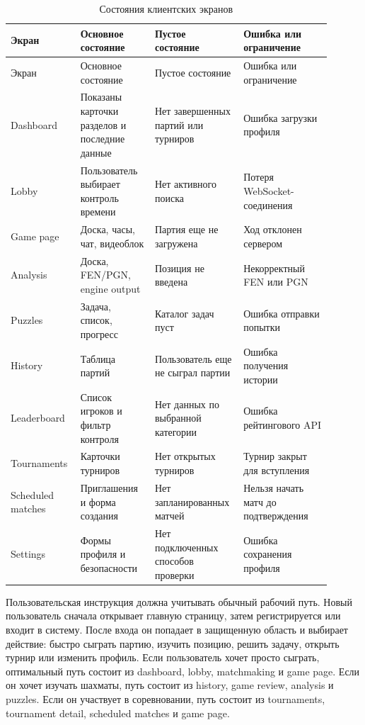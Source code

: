 \noindent\scriptsize
\setlength{\tabcolsep}{3pt}
\renewcommand{\arraystretch}{1.16}
\begin{longtable}{|>{\RaggedRight\arraybackslash}p{0.18\linewidth}|>{\RaggedRight\arraybackslash}p{0.22\linewidth}|>{\RaggedRight\arraybackslash}p{0.24\linewidth}|>{\RaggedRight\arraybackslash}p{0.26\linewidth}|}
\caption{Состояния клиентских экранов}\label{tab:client-screen-states}\\
\hline
Экран & Основное состояние & Пустое состояние & Ошибка или ограничение\\ \hline
\endfirsthead
\hline
Экран & Основное состояние & Пустое состояние & Ошибка или ограничение\\ \hline
\endhead
Dashboard & Показаны карточки разделов и последние данные & Нет завершенных партий или турниров & Ошибка загрузки профиля\\ \hline
Lobby & Пользователь выбирает контроль времени & Нет активного поиска & Потеря WebSocket-соединения\\ \hline
Game page & Доска, часы, чат, видеоблок & Партия еще не загружена & Ход отклонен сервером\\ \hline
Analysis & Доска, FEN/PGN, engine output & Позиция не введена & Некорректный FEN или PGN\\ \hline
Puzzles & Задача, список, прогресс & Каталог задач пуст & Ошибка отправки попытки\\ \hline
History & Таблица партий & Пользователь еще не сыграл партии & Ошибка получения истории\\ \hline
Leaderboard & Список игроков и фильтр контроля & Нет данных по выбранной категории & Ошибка рейтингового API\\ \hline
Tournaments & Карточки турниров & Нет открытых турниров & Турнир закрыт для вступления\\ \hline
Scheduled matches & Приглашения и форма создания & Нет запланированных матчей & Нельзя начать матч до подтверждения\\ \hline
Settings & Формы профиля и безопасности & Нет подключенных способов проверки & Ошибка сохранения профиля\\ \hline
\end{longtable}
\normalsize

Пользовательская инструкция должна учитывать обычный рабочий путь. Новый пользователь сначала открывает главную страницу, затем регистрируется или входит в систему. После входа он попадает в защищенную область и выбирает действие: быстро сыграть партию, изучить позицию, решить задачу, открыть турнир или изменить профиль. Если пользователь хочет просто сыграть, оптимальный путь состоит из dashboard, lobby, matchmaking и game page. Если он хочет изучать шахматы, путь состоит из history, game review, analysis и puzzles. Если он участвует в соревновании, путь состоит из tournaments, tournament detail, scheduled matches и game page.

